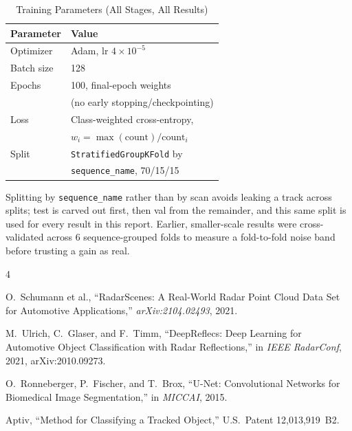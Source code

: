 \documentclass[10pt,letterpaper]{IEEEtran}
\begin{document}
\begin{table}[t]
  \centering
  \caption{Training Parameters (All Stages, All Results)}
  \label{tab:training}
  \begin{tabular}{ll}
    \toprule
    Parameter & Value \\
    \midrule
    Optimizer & Adam, lr $4\times10^{-5}$ \\
    Batch size & 128 \\
    Epochs & 100, final-epoch weights \\
    & (no early stopping/checkpointing) \\
    Loss & Class-weighted cross-entropy, \\
    & $w_i = \max(\text{count})/\text{count}_i$ \\
    Split & \texttt{StratifiedGroupKFold} by \\
    & \texttt{sequence\_name}, 70/15/15 \\
    \bottomrule
  \end{tabular}
\end{table}

Splitting by \texttt{sequence\_name} rather than by scan avoids leaking a
track across splits; test is carved out first, then val from the remainder,
and this same split is used for every result in this report. Earlier,
smaller-scale results were cross-validated across 6 sequence-grouped folds to
measure a fold-to-fold noise band before trusting a gain as real.

\begin{thebibliography}{4}

O.~Schumann et al., ``RadarScenes: A Real-World Radar Point Cloud Data Set
for Automotive Applications,'' \emph{arXiv:2104.02493}, 2021.

M.~Ulrich, C.~Glaser, and F.~Timm, ``DeepReflecs: Deep Learning for
Automotive Object Classification with Radar Reflections,'' in \emph{IEEE
RadarConf}, 2021, arXiv:2010.09273.

O.~Ronneberger, P.~Fischer, and T.~Brox, ``U-Net: Convolutional Networks for
Biomedical Image Segmentation,'' in \emph{MICCAI}, 2015.

Aptiv, ``Method for Classifying a Tracked Object,'' U.S.\ Patent
12{,}013{,}919~B2.

\end{thebibliography}
\end{document}

